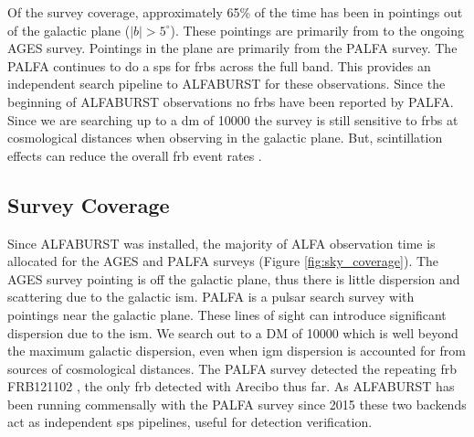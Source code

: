 \documentclass[a4paper,fleqn,usenatbib]{mnras}
\begin{document}
Of the survey coverage, approximately 65\% of the time has been in pointings out
of the galactic plane ($|b| > 5^{\circ}$).  These pointings are primarily from
to the ongoing AGES survey.  Pointings in the plane are primarily from the PALFA
survey. The PALFA continues to do a \gls{sps} for \glspl{frb} across the full
band. This provides an independent search pipeline to ALFABURST for these
observations. Since the beginning of ALFABURST observations no \glspl{frb} have
been reported by PALFA.  Since we are searching up to a \gls{dm} of 10000 the
survey is still sensitive to \glspl{frb} at cosmological distances when
observing in the galactic plane. But, scintillation effects can reduce the
overall \gls{frb} event rates \citep{2015MNRAS.451.3278M}.



\subsection{Survey Coverage}
\label{sec:survey_coverage}

Since ALFABURST was installed, the majority of ALFA observation time is
allocated for the AGES \citep{2006MNRAS.371.1617A} and PALFA
\citep{2006ApJ...637..446C} surveys (Figure \ref{fig:sky_coverage}).  The AGES
survey pointing is off the galactic plane, thus there is little dispersion and
scattering due to the galactic \gls*{ism}. PALFA is a pulsar search survey with
pointings near the galactic plane. These lines of sight can introduce
significant dispersion due to the \gls*{ism}. We search out to a DM of 10000
which is well beyond the maximum galactic dispersion, even when \gls*{igm}
dispersion is accounted for from sources of cosmological distances. The PALFA
survey detected the repeating \gls{frb} FRB121102 \citep{2014ApJ...790..101S},
the only \gls{frb} detected with Arecibo thus far. As ALFABURST has been running
commensally with the PALFA survey since 2015 these two backends act as
independent \gls{sps} pipelines, useful for detection verification.
\end{document}
